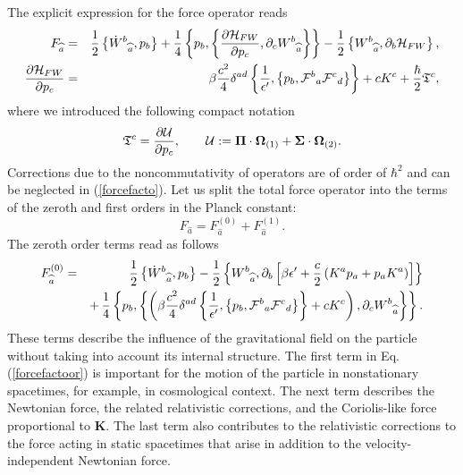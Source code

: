 \documentclass[preprint,showpacs,preprintnumbers,eqsecnum,amsmath,amssymb]{revtex4-1}
\begin{document}
The explicit expression for the force operator reads
\begin{eqnarray}
F_{\widehat a} &=& {\frac 12} \left\{\dot{W}^b{}_{\widehat a},p_b\right\} +
 {\frac 14} \left\{p_b,\left\{\frac{\partial {\cal H}_{FW}}{\partial p_c},
\partial_cW^b{}_{\widehat a}\right\}\right\} - {\frac 12}\left\{W^b{}_{\widehat a},
\partial_b{\cal H}_{FW}\right\},\label{forcefacto}\\
\frac{\partial {\cal H}_{FW}}{\partial p_c} &=& \beta\frac{c^2}{4}\delta^{ad}
\left\{\frac{1}{\epsilon'}, \left\{p_b, {\cal F}^b{}_a{\cal F}^c{}_d\right\}
\right\} + cK^c + \frac\hbar2\mathfrak{T}^c,\label{dpH}
\end{eqnarray}
where we introduced the following compact notation
\begin{equation}
\mathfrak{T}^c=\frac{\partial {\cal U}}{\partial p_c},\qquad {\cal U}
:= \bm\Pi\cdot\bm\Omega_{(1)} + \bm\Sigma\cdot\bm\Omega_{(2)}.\label{mathfrakT}
\end{equation}
Corrections due to the noncommutativity of operators are of order of $\hbar^2$
and can be neglected in (\ref{forcefacto}). Let us split the total force operator
into the terms of the zeroth and first orders in the Planck constant:
\begin{equation}
F_{\widehat a} = F_{\widehat a}^{(0)}+ F_{\widehat a}^{(1)}.\label{FFF}
\end{equation}
The zeroth order terms read as follows
\begin{eqnarray}
 F_{\widehat a}^{(0)} &=& {\frac 12} \left\{\dot{W}^b{}_{\widehat a},p_b\right\}
- {\frac 12}\left\{W^b{}_{\widehat a},\partial_b\left [\beta\epsilon' +
\frac c2\left(K^a p_a + p_a K^a\right) \right]\right\}\nonumber\\
&& +\,{\frac 14} \left\{p_b,\left\{\left(\beta\frac{c^2}{4}\delta^{ad}
\left\{\frac{1}{\epsilon'},\left\{p_b, {\cal F}^b{}_a{\cal F}^c{}_d\right\}
\right\}+cK^c\right),\partial_cW^b{}_{\widehat a}\right\}\right\}.\label{forcefactoor}
\end{eqnarray}
These terms describe the influence of the gravitational field on the particle
without taking into account its internal structure.
The first term in Eq. (\ref{forcefactoor}) is important for the motion
of the particle in nonstationary spacetimes, for example, in cosmological context.
The next term describes the Newtonian force, the related relativistic
corrections, and the Coriolis-like force proportional to $\bm K$. The last term
also contributes to the relativistic corrections to the force acting in static
spacetimes that arise in addition to the velocity-independent Newtonian force.
\end{document}
